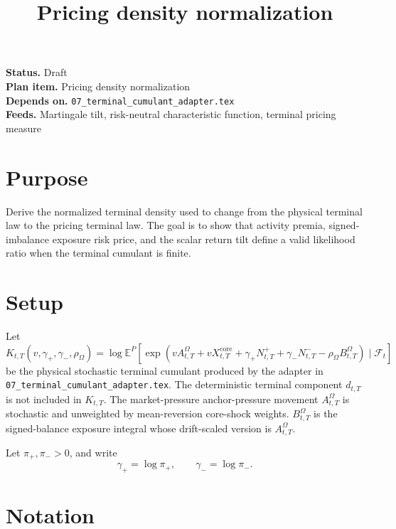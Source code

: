 \documentclass[11pt]{article}
\title{Pricing density normalization}
\author{}
\date{}
\begin{document}
\maketitle

\noindent\textbf{Status.} Draft\\
\textbf{Plan item.} Pricing density normalization\\
\textbf{Depends on.} \texttt{07\_terminal\_cumulant\_adapter.tex}\\
\textbf{Feeds.} Martingale tilt, risk-neutral characteristic function, terminal pricing measure

\section{Purpose}

Derive the normalized terminal density used to change from the physical
terminal law to the pricing terminal law.
The goal is to show that activity premia, signed-imbalance exposure risk price,
and the scalar return tilt define a valid likelihood ratio when the terminal
cumulant is finite.

\section{Setup}

Let
\[
    K_{t,T}(v,\gamma_+,\gamma_-,\rho_\Omega)
    =
    \log\mathbb E^P\!\left[
            \exp\!\left(
                vA_{t,T}^{\Omega}
                +vX_{t,T}^{\mathrm{core}}
                +\gamma_+N_{t,T}^+
                +\gamma_-N_{t,T}^-
                -\rho_\Omega B_{t,T}^\Omega
            \right)
\mid\mathcal F_t
\right]
\]
be the physical stochastic terminal cumulant produced by the adapter in
\texttt{07\_terminal\_cumulant\_adapter.tex}.
The deterministic terminal component \(d_{t,T}\) is not included in \(K_{t,T}\).
The market-pressure anchor-pressure movement \(A_{t,T}^{\Omega}\) is
stochastic and unweighted by mean-reversion core-shock weights.
\(B_{t,T}^\Omega\) is the signed-balance exposure integral whose drift-scaled
version is \(A_{t,T}^{\Omega}\).

Let \(\pi_+,\pi_->0\), and write
\[
    \gamma_+=\log\pi_+,
    \qquad
    \gamma_-=\log\pi_-.
\]

\section{Notation}
\end{document}
